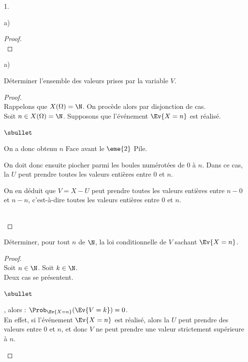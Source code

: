 \documentclass[11pt]{article}%
\begin{document}
\begin{noliste}{1.}
\begin{noliste}{a)}
\begin{proof}
      ~\\[-1.4cm]
    \end{proof}
  \end{noliste}
  
  
  
  
  \item 
  \begin{noliste}{a)}
    \setlength{\itemsep}{2mm}
    \item Déterminer l'ensemble des valeurs prises par la variable $V$.
    
    \begin{proof}~\\
      Rappelons que $X(\Omega)=\N$. On procède alors par disjonction de 
      cas.\\
      Soit $n\in X(\Omega)= \N$. Supposons que l'événement $\Ev{X=n}$ 
      est réalisé.
      \begin{noliste}{$\sbullet$}
        \item On a donc obtenu $n$ Face avant le $\eme{2}$ Pile.
        \item On doit donc ensuite piocher parmi les boules 
        numérotées de $0$ à $n$. Dans ce cas, la \var $U$ peut 
	prendre toutes les valeurs entières entre $0$ et $n$.
	\item On en déduit que $V=X-U$ peut prendre toutes les 
	valeurs entières entre $n-0$ et $n-n$, c'est-à-dire toutes 
	les valeurs entières entre $0$ et $n$.
      \end{noliste}
      
      ~\\[-1.4cm]
    \end{proof}
    
    \item Déterminer, pour tout $n$ de $\N$, la loi conditionnelle de 
    $V$ sachant $\Ev{X=n}$.
    
    \begin{proof}~\\
      Soit $n\in \N$. Soit $k\in \N$.\\
      Deux cas se présentent.
      \begin{noliste}{$\sbullet$}
	\item {}, alors : 
	$\Prob_{\Ev{X=n}}(\Ev{V=k})=0$.\\[.1cm]
	En effet, si l'événement $\Ev{X=n}$ est réalisé, alors la 
	\var $U$ peut prendre des valeurs entre $0$ et $n$, et donc 
	$V$ ne peut prendre une valeur strictement supérieure à $n$.
	

\end{noliste}
\end{proof}
\end{noliste}
\end{noliste}
\end{document}
